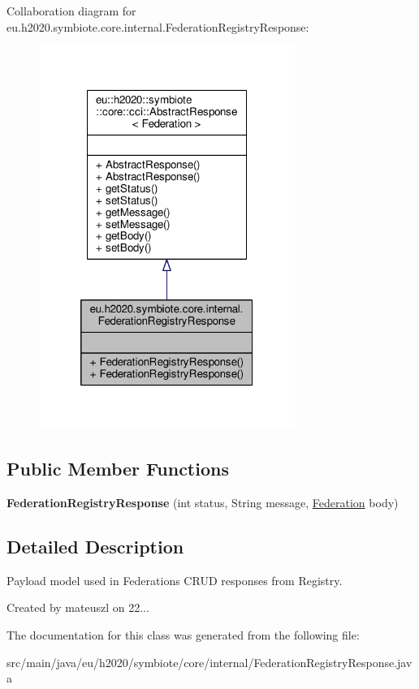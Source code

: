 Collaboration diagram for eu.\+h2020.\+symbiote.\+core.\+internal.\+Federation\+Registry\+Response\+:
\nopagebreak
\begin{figure}[H]
\begin{center}
\leavevmode
\includegraphics[width=236pt]{classeu_1_1h2020_1_1symbiote_1_1core_1_1internal_1_1FederationRegistryResponse__coll__graph}
\end{center}
\end{figure}
\subsection*{Public Member Functions}
\begin{DoxyCompactItemize}
\item 
\mbox{\label{classeu_1_1h2020_1_1symbiote_1_1core_1_1internal_1_1FederationRegistryResponse_ab9d6a1c41979a79f29703202003a8931}} 
{\bfseries Federation\+Registry\+Response} (int status, String message, \hyperlink{classeu_1_1h2020_1_1symbiote_1_1model_1_1mim_1_1Federation}{Federation} body)
\end{DoxyCompactItemize}


\subsection{Detailed Description}
Payload model used in Federations C\+R\+UD responses from Registry.

Created by mateuszl on 22... 

The documentation for this class was generated from the following file\+:\begin{DoxyCompactItemize}
\item 
src/main/java/eu/h2020/symbiote/core/internal/Federation\+Registry\+Response.\+java\end{DoxyCompactItemize}
